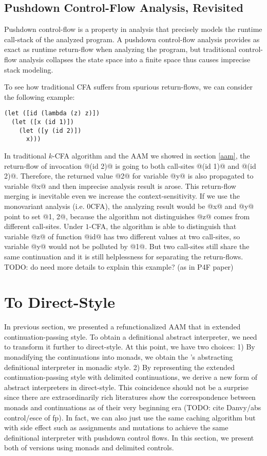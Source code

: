 \documentclass[acmsmall,review,anonymous]{acmart}\settopmatter{printfolios=true,printccs=false,printacmref=false}
\begin{document}
\subsection{Pushdown Control-Flow Analysis, Revisited} \label{pdcfarevisit}

Pushdown control-flow is a property in analysis that precisely models
the runtime call-stack of the analyzed program. 
A pushdown control-flow analysis provides as exact as runtime return-flow 
when analyzing the program, but traditional control-flow analysis collapses 
the state space into a finite space thus causes imprecise stack modeling.

To see how traditional CFA suffers from spurious return-flows, 
we can consider the following example:

\begin{lstlisting}
(let ([id (lambda (z) z)])
  (let ([x (id 1)])
    (let ([y (id 2)])
      x)))
\end{lstlisting}

In traditional $k$-CFA algorithm and the AAM we showed in section \ref{aam}, 
the return-flow of invocation @(id 2)@
is going to both call-sites @(id 1)@ and @(id 2)@. Therefore, the
returned value @2@ for variable @y@ is also propagated to 
variable @x@ and then imprecise analysis result is arose.
This return-flow merging is inevitable even we increase the context-sensitivity.
If we use the monovariant analysis (i.e. 0CFA), the analyzing result would be @x@ and 
@y@ point to set @{1, 2}@, because the algorithm not distinguishes
@z@ comes from different call-sites.
Under $1$-CFA, the algorithm is able to distinguish that variable @z@ of function
@id@ has two different values at two call-sites, so variable @y@ 
would not be polluted by @1@. 
But two call-sites still share the same continuation and
it is still helplessness for separating the return-flows.
TODO: do need more details to explain this example? (as in P4F paper)

\section{To Direct-Style}

In previous section, we presented a refunctionalized AAM that in extended continuation-passing style. 
To obtain a definitional abstract interpreter, we need to transform it further to direct-style. 
At this point, we have two choices: 
1) By monadifying the continuations into monads, we obtain the \citeauthor{darais2017abstracting}'s 
abstracting definitional interpreter in monadic style.
2) By representing the extended continuation-passing style with delimited continuations,
we derive a new form of abstract interpreters in direct-style.
This coincidence should not be a surprise since there are extraordinarily rich literatures 
show the correspondence between monads and continuations as of their very beginning era
(TODO: cite Danvy/abs control/esce of fp).
In fact, we can also just use the same caching algorithm but with side effect such as 
assignments and mutations to achieve the same definitional interpreter with pushdown
control flows.
In this section, we present both of versions using monads and delimited controls.
\end{document}
